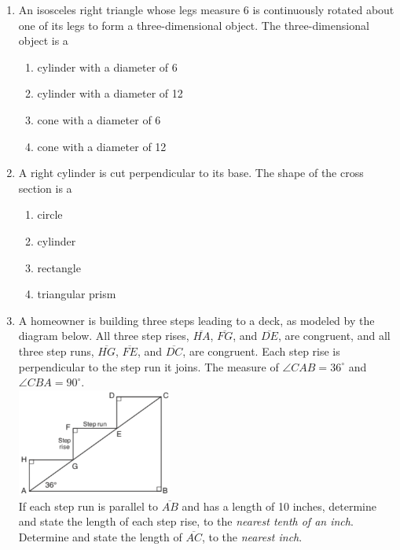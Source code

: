 \documentclass[12pt, twoside]{article}
\begin{document}
\begin{enumerate}
  \item An isosceles right triangle whose legs measure 6 is continuously rotated about one of its legs to form a three-dimensional object. The three-dimensional object is a
    \begin{enumerate}
      \item cylinder with a diameter of 6
      \item cylinder with a diameter of 12
      \item cone with a diameter of 6
      \item cone with a diameter of 12
    \end{enumerate}

    \item A right cylinder is cut perpendicular to its base. The shape of the cross section is a
      \begin{enumerate}
        \item circle
        \item cylinder
        \item rectangle
        \item triangular prism
      \end{enumerate}

    \item A homeowner is building three steps leading to a deck, as modeled by the diagram below. All three step rises, $\overline{HA}$,  $\overline{FG}$, and  $\overline{DE}$, are congruent, and all three step runs, $\overline{HG}$,  $\overline{FE}$, and  $\overline{DC}$, are congruent. Each step rise is perpendicular to the step run it joins. The measure of $\angle CAB = 36^\circ$ and $\angle CBA = 90^\circ$.\\[0.5cm]
      \includegraphics[width=0.4\textwidth]{steps_Aug2018-33.png}\\
    If each step run is parallel to $\overline{AB}$ and has a length of 10 inches, determine and state the length of each step rise, to the \emph{nearest tenth of an inch}.\\[3cm]
    Determine and state the length of $\overline{AC}$, to the \emph{nearest inch}.

\end{enumerate}
\end{document}
